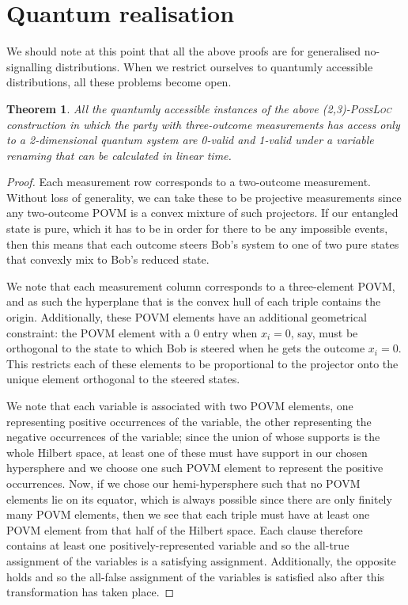 \documentclass[reprint]{revtex4-1}
\newtheorem{thm}{Theorem}
\theoremstyle{definition}
\begin{document}
\section{Quantum realisation}
We should note at this point that all the above proofs are for generalised no-signalling distributions. When we restrict ourselves to quantumly accessible distributions, all these problems become open.


\begin{thm}
All the quantumly accessible instances of the above \textsc{(2,3)-PossLoc} construction in which the party with three-outcome measurements has access only to a 2-dimensional quantum system are 0-valid and 1-valid under a variable renaming that can be calculated in linear time.
\end{thm}
\begin{proof}
Each measurement row corresponds to a two-outcome measurement. Without loss of generality, we can take these to be projective measurements since any two-outcome POVM is a convex mixture of such projectors. If our entangled state is pure, which it has to be in order for there to be any impossible events, then this means that each outcome steers Bob's system to one of two pure states that convexly mix to Bob's reduced state.

We note that each measurement column corresponds to a three-element POVM, and as such the hyperplane that is the convex hull of each triple contains the origin. Additionally, these POVM elements have an additional geometrical constraint: the POVM element with a 0 entry when $x_i=0$, say, must be orthogonal to the state to which Bob is steered when he gets the outcome $x_i=0$. This restricts each of these elements to be proportional to the projector onto the unique element orthogonal to the steered states.

We note that each variable is associated with two POVM elements, one representing positive occurrences of the variable, the other representing the negative occurrences of the variable; since the union of whose supports is the whole Hilbert space, at least one of these must have support in our chosen hypersphere and we choose one such POVM element to represent the positive occurrences. Now, if we chose our hemi-hypersphere such that no POVM elements lie on its equator, which is always possible since there are only finitely many POVM elements, then we see that each triple must have at least one POVM element from that half of the Hilbert space. Each clause therefore contains at least one positively-represented variable and so the all-true assignment of the variables is a satisfying assignment. Additionally, the opposite holds and so the all-false assignment of the variables is satisfied also after this transformation has taken place.
\end{proof}
\end{document}
